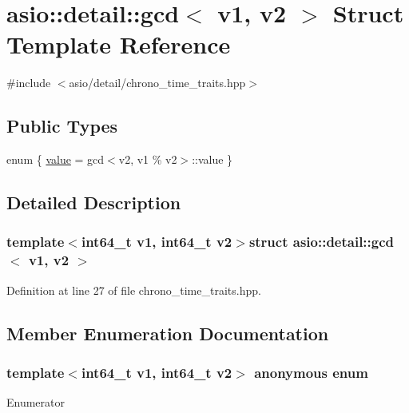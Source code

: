 \hypertarget{structasio_1_1detail_1_1gcd}{}\section{asio\+:\+:detail\+:\+:gcd$<$ v1, v2 $>$ Struct Template Reference}
\label{structasio_1_1detail_1_1gcd}


{\ttfamily \#include $<$asio/detail/chrono\+\_\+time\+\_\+traits.\+hpp$>$}

\subsection*{Public Types}
\begin{DoxyCompactItemize}
\item 
enum \{ \hyperlink{structasio_1_1detail_1_1gcd_a32127e6e61dc395a21be843f40a8e851a4e8b4d036a269ed9f19f884fe448cc5f}{value} = gcd$<$v2, v1 \% v2$>$\+:\+:value
 \}
\end{DoxyCompactItemize}


\subsection{Detailed Description}
\subsubsection*{template$<$int64\+\_\+t v1, int64\+\_\+t v2$>$struct asio\+::detail\+::gcd$<$ v1, v2 $>$}



Definition at line 27 of file chrono\+\_\+time\+\_\+traits.\+hpp.



\subsection{Member Enumeration Documentation}
\hypertarget{structasio_1_1detail_1_1gcd_a32127e6e61dc395a21be843f40a8e851}{}\subsubsection[{anonymous enum}]{\setlength{\rightskip}{0pt plus 5cm}template$<$int64\+\_\+t v1, int64\+\_\+t v2$>$ anonymous enum}\label{structasio_1_1detail_1_1gcd_a32127e6e61dc395a21be843f40a8e851}
\begin{Desc}
\item[Enumerator]\par
\begin{description}
\item[{\em 
\hypertarget{structasio_1_1detail_1_1gcd_a32127e6e61dc395a21be843f40a8e851a4e8b4d036a269ed9f19f884fe448cc5f}{}value\label{structasio_1_1detail_1_1gcd_a32127e6e61dc395a21be843f40a8e851a4e8b4d036a269ed9f19f884fe448cc5f}
}]\end{description}
\end{Desc}


